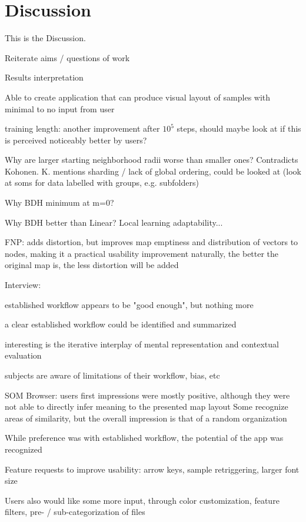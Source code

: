 
\section{Discussion}
\label{sec:discussion}
This is the Discussion.

Reiterate aims / questions of work



Results interpretation

Able to create application that can produce visual layout of samples with
minimal to no input from user

training length: another improvement after $10^5$ steps, should maybe look at
if this is perceived noticeably better by users?

Why are larger starting neighborhood radii worse than smaller ones? Contradicts
Kohonen. K. mentions sharding / lack of global ordering, could be looked at
(look at soms for data labelled with groups, e.g. subfolders)

Why BDH minimum at m=0?

Why BDH better than Linear? Local learning adaptability...

FNP: adds distortion, but improves map emptiness and distribution of vectors to
nodes, making it a practical usability improvement
naturally, the better the original map is, the less distortion will be added

Interview:

established workflow appears to be "good enough", but nothing more

a clear established workflow could be identified and summarized

interesting is the iterative interplay of mental representation and contextual
evaluation

subjects are aware of limitations of their workflow, bias, etc

SOM Browser: users first impressions were mostly positive, although they were
not able to directly infer meaning to the presented map layout
Some recognize areas of similarity, but the overall impression is that of a
random organization

While preference was with established workflow, the potential of the app was
recognized

Feature requests to improve usability: arrow keys, sample retriggering, larger
font size

Users also would like some more input, through color customization, feature
filters, pre- / sub-categorization of files





